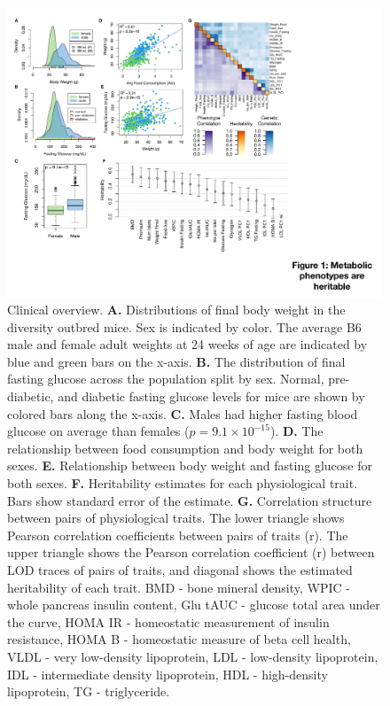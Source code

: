 \documentclass[
]{article}
\begin{document}
\begin{figure}[ht!]
\includegraphics[width=\textwidth]{Figures/Fig1_trait_overview.pdf} 
\caption{ Clinical overview. \textbf{A.} Distributions of final body 
weight in the diversity outbred mice. Sex is indicated by color. 
The average B6 male and female adult weights at 24 weeks of 
age are indicated by blue and green bars on the x-axis. \textbf{B.} 
The distribution of final fasting glucose across the population split 
by sex. Normal, pre-diabetic, and diabetic fasting glucose levels for 
mice are shown by colored bars along the x-axis. \textbf{C.} Males 
had higher fasting blood glucose on average than females 
($p = 9.1\times10^{-15}$). \textbf{D.} The relationship between 
food consumption and body weight for both sexes. \textbf{E.} 
Relationship between body weight and fasting glucose for both 
sexes. \textbf{F.} Heritability estimates for each physiological trait. 
Bars show standard error of the estimate. \textbf{G.} Correlation 
structure between pairs of physiological traits. The lower triangle 
shows Pearson correlation coefficients between pairs of traits (r). 
The upper triangle shows the Pearson correlation coefficient (r) 
between LOD traces of pairs of traits, and diagonal shows the 
estimated heritability of each trait. BMD - bone mineral density,
WPIC - whole pancreas insulin content, Glu tAUC - glucose total area under 
the curve, HOMA IR - homeostatic measurement of insulin resistance, HOMA B - 
homeostatic measure of beta cell health, VLDL - very low-density lipoprotein,
LDL - low-density lipoprotein, IDL - intermediate density lipoprotein, 
HDL - high-density lipoprotein, TG - triglyceride.
}
\label{fig:trait_overview}
\end{figure}
\end{document}

